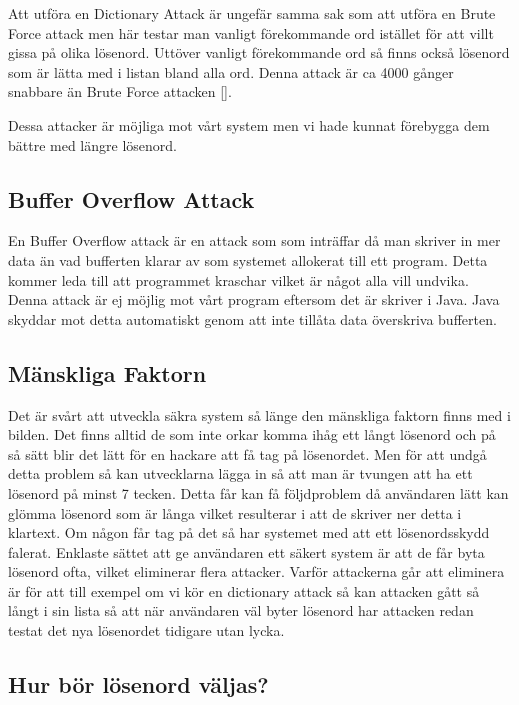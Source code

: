 Att utföra en Dictionary Attack är ungefär samma sak som att utföra en Brute Force attack men här testar man vanligt förekommande ord istället för att villt gissa på olika lösenord. Uttöver vanligt förekommande ord så finns också lösenord som är lätta med i listan bland alla ord. Denna attack är ca 4000 gånger snabbare än Brute Force attacken [\cite{F4}]. 

Dessa attacker är möjliga mot vårt system men vi hade kunnat förebygga dem bättre med längre lösenord. 

\subsection{Buffer Overflow Attack}

En Buffer Overflow attack är en attack som som inträffar då man skriver in mer data än vad bufferten klarar av som systemet allokerat till ett program. Detta kommer leda till att programmet kraschar vilket är något alla vill undvika. Denna attack är ej möjlig mot vårt program eftersom det är skriver i Java. Java skyddar mot detta automatiskt genom att inte tillåta data överskriva bufferten.

\subsection{Mänskliga Faktorn}

Det är svårt att utveckla säkra system så länge den mänskliga faktorn finns med i bilden. Det finns alltid de som inte orkar komma ihåg ett långt lösenord och på så sätt blir det lätt för en hackare att få tag på lösenordet. Men för att undgå detta problem så kan utvecklarna lägga in så att man är tvungen att ha ett lösenord på minst 7 tecken. Detta får kan få följdproblem då användaren lätt kan glömma lösenord som är långa vilket resulterar i att de skriver ner detta i klartext. Om någon får tag på det så har systemet med att ett lösenordsskydd falerat. Enklaste sättet att ge användaren ett säkert system är att de får byta lösenord ofta, vilket eliminerar flera attacker. Varför attackerna går att eliminera är för att till exempel om vi kör en dictionary attack så kan attacken gått så långt i sin lista så att när användaren väl byter lösenord har attacken redan testat det nya lösenordet tidigare utan lycka. 

\subsection{Hur bör lösenord väljas?}

